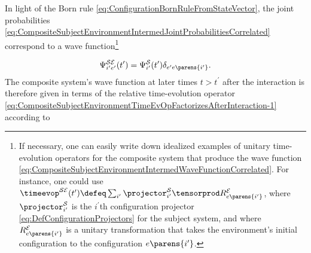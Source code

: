 \documentclass[12pt,english,prl,superscriptaddress,nobibnotes,nofootinbib]{revtex4-2}
\let\originalleft\left
\let\originalright\right
\renewcommand{\left}{\mathopen{}\mathclose\bgroup\originalleft}
\renewcommand{\right}{\aftergroup\egroup\originalright}
\begin{document}
In light of the Born rule \eqref{eq:ConfigurationBornRuleFromStateVector},
the joint probabilities \eqref{eq:CompositeSubjectEnvironmentIntermedJointProbabilitiesCorrelated}
correspond to a wave function\footnote{If necessary, one can easily write down idealized examples of unitary
time-evolution operators for the composite system that produce the
wave function \eqref{eq:CompositeSubjectEnvironmentIntermedWaveFunctionCorrelated}.
For instance, one could use $\timeevop^{\mathcal{S}\mathcal{E}}\left(t^{\prime}\right)\defeq\sum_{i^{\prime}}\projector_{i^{\prime}}^{\mathcal{S}}\tensorprod R_{e\parens{i^{\prime}}}^{\mathcal{E}}$,
where $\projector_{i^{\prime}}^{\mathcal{S}}$ is the $i^{\prime}$th
configuration projector \eqref{eq:DefConfigurationProjectors} for
the subject system, and where $R_{e\parens{i^{\prime}}}^{\mathcal{E}}$
is a unitary transformation that takes the environment's initial configuration
to the configuration $e\parens{i^{\prime}}$.} 

\begin{equation}
\Psi_{i^{\prime}e^{\prime}}^{\mathcal{S}\mathcal{E}}\left(t^{\prime}\right)=\Psi_{i^{\prime}}^{\mathcal{S}}\left(t^{\prime}\right)\delta_{e^{\prime}e\parens{i^{\prime}}}.\label{eq:CompositeSubjectEnvironmentIntermedWaveFunctionCorrelated}
\end{equation}
 The composite system's wave function at later times $t>t^{\prime}$
after the interaction is therefore given in terms of the relative
time-evolution operator \eqref{eq:CompositeSubjectEnvironmentTimeEvOpFactorizesAfterInteraction-1}
according to 
\end{document}
